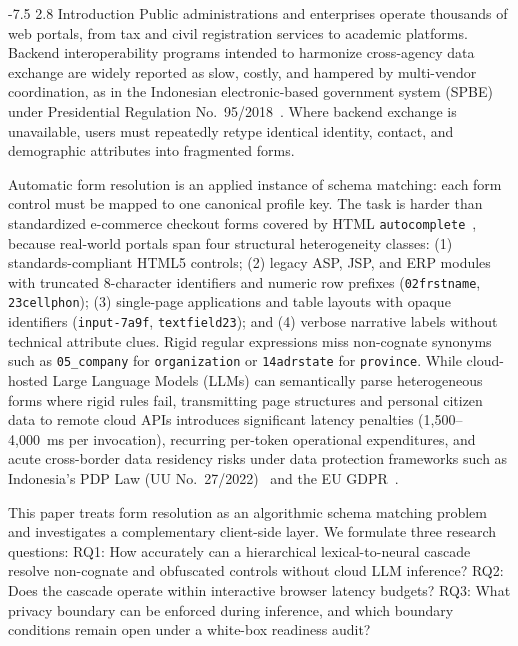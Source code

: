 \documentclass[runningheads,a4paper]{llncs}
\makeatletter
\renewcommand\section{\@startsection{section}{1}{\z@}%
  {-7.5\p@ \@plus -2\p@ \@minus -1\p@}%
  {2.8\p@ \@plus 1\p@}%
  {\normalfont\large\bfseries}}
\makeatother
\begin{document}
\section{Introduction}
Public administrations and enterprises operate thousands of web portals, from tax and civil registration services to academic platforms. Backend interoperability programs intended to harmonize cross-agency data exchange are widely reported as slow, costly, and hampered by multi-vendor coordination, as in the Indonesian electronic-based government system (SPBE) under Presidential Regulation No.~95/2018~\cite{spbe,perpres}. Where backend exchange is unavailable, users must repeatedly retype identical identity, contact, and demographic attributes into fragmented forms.

Automatic form resolution is an applied instance of schema matching: each form control must be mapped to one canonical profile key. The task is harder than standardized e-commerce checkout forms covered by HTML \texttt{autocomplete}~\cite{whatwg}, because real-world portals span four structural heterogeneity classes: (1) standards-compliant HTML5 controls; (2) legacy ASP, JSP, and ERP modules with truncated 8-character identifiers and numeric row prefixes (\texttt{02frstname}, \texttt{23cellphon}); (3) single-page applications and table layouts with opaque identifiers (\texttt{input-7a9f}, \texttt{textfield23}); and (4) verbose narrative labels without technical attribute clues. Rigid regular expressions miss non-cognate synonyms such as \texttt{05\_company} for \texttt{organization} or \texttt{14adrstate} for \texttt{province}. While cloud-hosted Large Language Models (LLMs) can semantically parse heterogeneous forms where rigid rules fail, transmitting page structures and personal citizen data to remote cloud APIs introduces significant latency penalties (1,500--4,000~ms per invocation), recurring per-token operational expenditures, and acute cross-border data residency risks under data protection frameworks such as Indonesia's PDP Law (UU No.~27/2022)~\cite{uupdp} and the EU GDPR~\cite{gdpr}.

This paper treats form resolution as an algorithmic schema matching problem and investigates a complementary client-side layer. We formulate three research questions:
RQ1: How accurately can a hierarchical lexical-to-neural cascade resolve non-cognate and obfuscated controls without cloud LLM inference?
RQ2: Does the cascade operate within interactive browser latency budgets?
RQ3: What privacy boundary can be enforced during inference, and which boundary conditions remain open under a white-box readiness audit?
\end{document}
